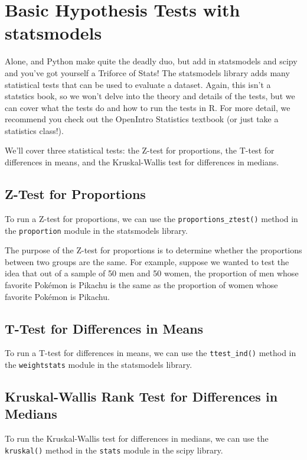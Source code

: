 \section{Basic Hypothesis Tests with statsmodels}
Alone,  and Python make quite the deadly duo, but add in statsmodels and scipy and you've got yourself a Triforce of Stats! The statsmodels library adds many statistical tests that can be used to evaluate a dataset. Again, this isn't a statstics book, so we won't delve into the theory and details of the tests, but we can cover what the tests do and how to run the tests in R. For more detail, we recommend you check out the OpenIntro Statistics textbook (or just take a statistics class!).\par
We'll cover three statistical tests: the Z-test for proportions, the T-test for differences in means, and the Kruskal-Wallis test for differences in medians.
\subsection{Z-Test for Proportions}
To run a Z-test for proportions, we can use the \verb|proportions_ztest()| method in the \verb|proportion| module in the statsmodels library.\par
The purpose of the Z-test for proportions is to determine whether the proportions between two groups are the same. For example, suppose we wanted to test the idea that out of a sample of 50 men and 50 women, the proportion of men whose favorite Pok\'emon is Pikachu is the same as the proportion of women whose favorite Pok\'emon is Pikachu.
\subsection{T-Test for Differences in Means}
To run a T-test for differences in means, we can use the \verb|ttest_ind()| method in the \verb|weightstats| module in the statsmodels library.
\subsection{Kruskal-Wallis Rank Test for Differences in Medians}
To run the Kruskal-Wallis test for differences in medians, we can use the \verb|kruskal()| method in the \verb|stats| module in the scipy library.
